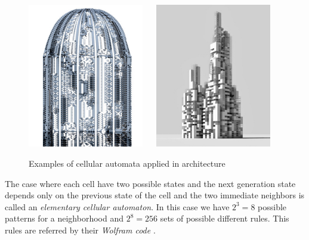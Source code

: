 \begin{figure}
        \centering
                \includegraphics[width=0.45\textwidth]{img/Theory/Cellular_A/dome1.jpg}
          ~~
                \includegraphics[width=0.45\textwidth]{img/Theory/Cellular_A/main1.jpg}
        \caption{Examples of cellular automata applied in architecture}
        \label{fig:CAarchitecture}
\end{figure}

The case where each cell have two possible states and the next generation state depends only on the previous state of the cell and the two immediate neighbors is called an \emph{elementary cellular automaton}. In this case we have $2^3 = 8$ possible patterns for a neighborhood and $2^8 = 256$ sets of possible different rules. This rules are referred by their \emph{Wolfram code} \cite{CellularAutWOLFRAM}. 

